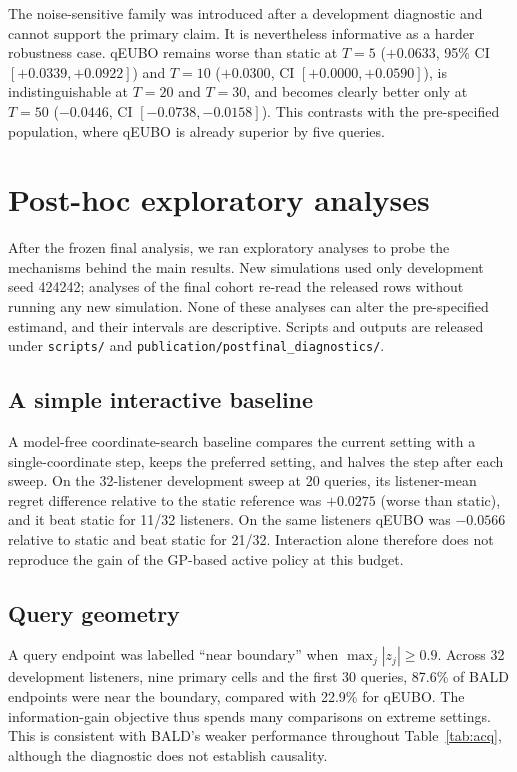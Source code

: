 \documentclass[preprint,12pt]{elsarticle}
\begin{document}
The noise-sensitive family was introduced after a development diagnostic and cannot support the primary claim. It is nevertheless informative as a harder robustness case. qEUBO remains worse than static at $T=5$ ($+0.0633$, 95\% CI $[+0.0339,+0.0922]$) and $T=10$ ($+0.0300$, CI $[+0.0000,+0.0590]$), is indistinguishable at $T=20$ and $T=30$, and becomes clearly better only at $T=50$ ($-0.0446$, CI $[-0.0738,-0.0158]$). This contrasts with the pre-specified population, where qEUBO is already superior by five queries.

\section{Post-hoc exploratory analyses}
\label{sec:exploratory}

After the frozen final analysis, we ran exploratory analyses to probe the mechanisms behind the main results. New simulations used only development seed 424242; analyses of the final cohort re-read the released rows without running any new simulation. None of these analyses can alter the pre-specified estimand, and their intervals are descriptive. Scripts and outputs are released under \texttt{scripts/} and \texttt{publication/postfinal\_diagnostics/}.

\subsection{A simple interactive baseline}

A model-free coordinate-search baseline compares the current setting with a single-coordinate step, keeps the preferred setting, and halves the step after each sweep. On the 32-listener development sweep at 20 queries, its listener-mean regret difference relative to the static reference was $+0.0275$ (worse than static), and it beat static for 11/32 listeners. On the same listeners qEUBO was $-0.0566$ relative to static and beat static for 21/32. Interaction alone therefore does not reproduce the gain of the GP-based active policy at this budget.

\subsection{Query geometry}

A query endpoint was labelled ``near boundary'' when $\max_j |z_j|\geq0.9$. Across 32 development listeners, nine primary cells and the first 30 queries, 87.6\% of BALD endpoints were near the boundary, compared with 22.9\% for qEUBO. The information-gain objective thus spends many comparisons on extreme settings. This is consistent with BALD's weaker performance throughout Table~\ref{tab:acq}, although the diagnostic does not establish causality.
\end{document}
